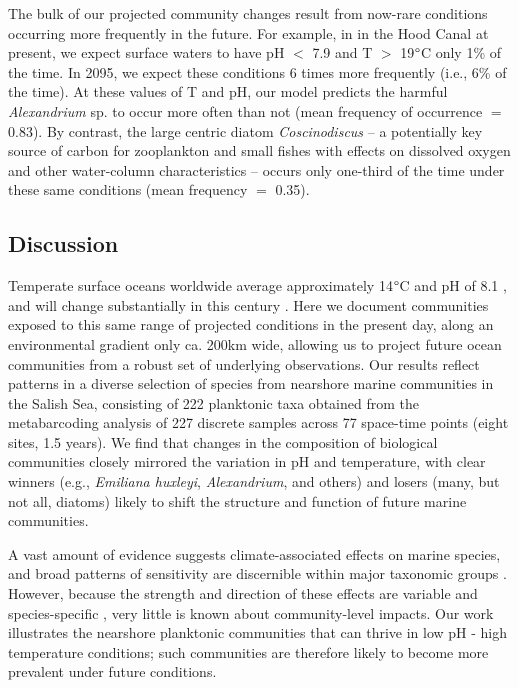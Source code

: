 \documentclass[11pt]{article}
\begin{document}
\begin{linenumbers}
{\color{red}The bulk of our projected community changes result from now-rare conditions occurring more frequently in the future. For example, in in the Hood Canal at present, we expect surface waters to have pH $<$ 7.9 and T $>$ 19$\degree$C only 1\% of the time. In 2095, we expect these conditions 6 times more frequently (i.e., 6\% of the time). At these values of T and pH, our model predicts the harmful \textit{Alexandrium} sp. to occur more often than not (mean frequency of occurrence $=$ 0.83). By contrast, the large centric diatom \textit{Coscinodiscus} -- a potentially key source of carbon for zooplankton and small fishes \cite{pasquaud2010determination, zamon2002tidal} with effects on dissolved oxygen and other water-column characteristics \cite{manabe1991bloom} -- occurs only one-third of the time under these same conditions (mean frequency $=$ 0.35).}

\subsection*{Discussion}

Temperate surface oceans worldwide average approximately 14$\degree$C and pH of 8.1 \cite{bopp2013multiple}, and will change substantially in this century \citep[mean $\Delta$ T 2.5$\degree$C, $\Delta$ pH -0.35 globally; RCP 8.5;][]{gattuso2015contrasting}.  Here we document communities exposed to this same range of projected conditions in the present day, along an environmental gradient only ca. 200km wide, allowing us to project future ocean communities from a robust set of underlying observations. Our results reflect patterns in a diverse selection of species from nearshore marine communities in the Salish Sea, consisting of 222 planktonic taxa obtained from the metabarcoding analysis of 227 discrete samples across 77 space-time points (eight sites, 1.5 years). We find that changes in the composition of biological communities closely mirrored the variation in pH and temperature, with clear winners (e.g., \textit{Emiliana huxleyi}, \textit{Alexandrium}, and others) and losers (many, but not all, diatoms) likely to shift the structure and function of future marine communities.

A vast amount of evidence suggests climate-associated effects on marine species, and broad patterns of sensitivity are discernible within major taxonomic groups  \citep[][among many others]{gattuso2015contrasting, stock2017reconciling}. However, because the strength and direction of these effects are variable and species-specific \cite{kroeker2013impacts}, very little is known about community-level impacts. Our work illustrates the nearshore planktonic communities that can thrive in low pH - high temperature conditions; such communities are therefore likely to become more prevalent under future conditions. 


\end{linenumbers}
\end{document}
